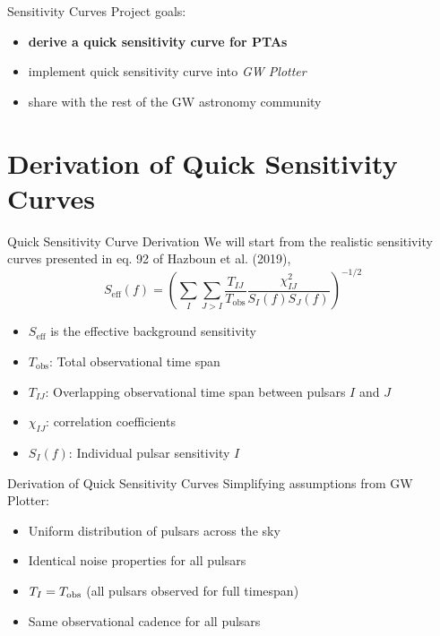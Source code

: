 \documentclass{beamer}
\begin{document}
\begin{frame}{Sensitivity Curves}
    Project goals:
    \begin{itemize}
        \item \textbf{derive a quick sensitivity curve for PTAs}
        \item implement quick sensitivity curve into \textit{GW Plotter}
        \item share with the rest of the GW astronomy community
    \end{itemize}
\end{frame}

\section{Derivation of Quick Sensitivity Curves}

\begin{frame}{Quick Sensitivity Curve Derivation}
    We will start from the realistic sensitivity curves presented in eq. 92 of Hazboun et al. (2019),
    \[
    S_{\text{eff}}(f) = \left( \sum_I \sum_{J > I} \frac{T_{IJ}}{T_{\text{obs}}} \frac{\chi_{IJ}^2}{S_I(f) S_J(f)} \right)^{-1/2}
    \]
    \begin{itemize}
        \item $S_{\text{eff}}$ is the effective background sensitivity
        \item $T_{\text{obs}}$: Total observational time span
        \item $T_{IJ}$: Overlapping observational time span between pulsars $I$ and $J$
        \item $\chi_{IJ}$: correlation coefficients
        \item $S_I(f)$: Individual pulsar sensitivity $I$
    \end{itemize}
\end{frame}

\begin{frame}{Derivation of Quick Sensitivity Curves}
    Simplifying assumptions from GW Plotter:
    \begin{itemize}
        \item Uniform distribution of pulsars across the sky
        \item Identical noise properties for all pulsars
        \item $T_I = T_{\rm obs}$ (all pulsars observed for full timespan)
        \item Same observational cadence for all pulsars
    \end{itemize}
\end{frame}
\end{document}
